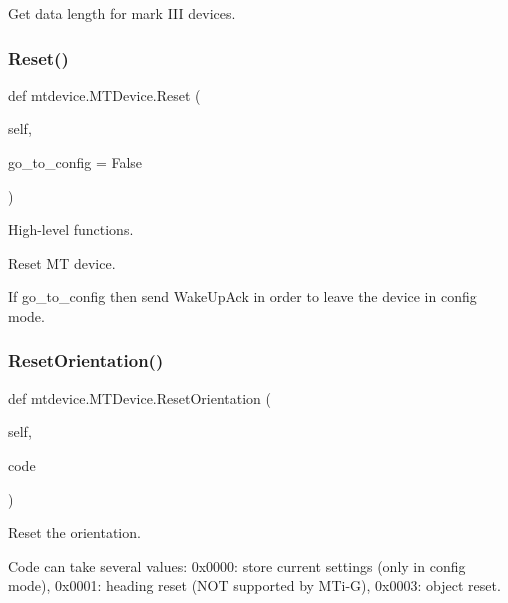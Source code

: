 \begin{DoxyVerb}Get data length for mark III devices.\end{DoxyVerb}
 \mbox{\label{classmtdevice_1_1MTDevice_aa3a48c919b8a17d421468faba4b7045f}} 
\subsubsection{\texorpdfstring{Reset()}{Reset()}}
{\footnotesize\ttfamily def mtdevice.\+M\+T\+Device.\+Reset (\begin{DoxyParamCaption}\item[{}]{self,  }\item[{}]{go\+\_\+to\+\_\+config = {\ttfamily False} }\end{DoxyParamCaption})}



High-\/level functions. 

\begin{DoxyVerb}Reset MT device.

If go_to_config then send WakeUpAck in order to leave the device in
config mode.
\end{DoxyVerb}
 \mbox{\label{classmtdevice_1_1MTDevice_a29424b8cc73d27252ed151075735c0e5}} 
\subsubsection{\texorpdfstring{Reset\+Orientation()}{ResetOrientation()}}
{\footnotesize\ttfamily def mtdevice.\+M\+T\+Device.\+Reset\+Orientation (\begin{DoxyParamCaption}\item[{}]{self,  }\item[{}]{code }\end{DoxyParamCaption})}

\begin{DoxyVerb}Reset the orientation.

Code can take several values:
    0x0000: store current settings (only in config mode),
    0x0001: heading reset (NOT supported by MTi-G),
    0x0003: object reset.
\end{DoxyVerb}
 \mbox{\label{classmtdevice_1_1MTDevice_a1b86412ad2c180bcfd6bbf4ea62f76a4}} 

